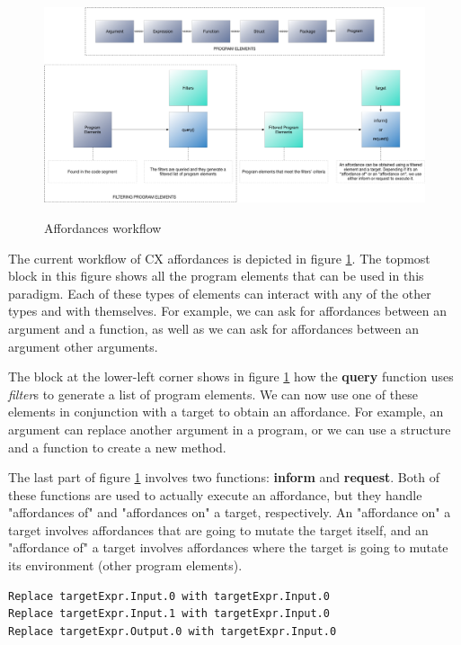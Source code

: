 \documentclass[11pt,fleqn,openany]{book} %
\begin{document}
\begin{figure}
\caption{Affordances workflow}
\centering
\includegraphics[width=1.0\textwidth]{img/affordances.png}
\label{figure:affordances-workflow}
\end{figure}

The current workflow of CX affordances is depicted in figure \ref{figure:affordances-workflow}. The topmost block in this figure shows all the program elements that can be used in this paradigm. Each of these types of elements can interact with any of the other types and with themselves. For example, we can ask for affordances between an argument and a function, as well as we can ask for affordances between an argument other arguments.

The block at the lower-left corner shows in figure \ref{figure:affordances-workflow} how the \textbf{query} function uses \emph{filter}s to generate a list of program elements. We can now use one of these elements in conjunction with a target to obtain an affordance. For example, an argument can replace another argument in a program, or we can use a structure and a function to create a new method.

The last part of figure \ref{figure:affordances-workflow} involves two functions: \textbf{inform} and \textbf{request}. Both of these functions are used to actually execute an affordance, but they handle "affordances of" and "affordances on" a target, respectively. An "affordance on" a target involves affordances that are going to mutate the target itself, and an "affordance of" a target involves affordances where the target is going to mutate its environment (other program elements).

\begin{lstlisting}[caption={A list of "affordances of" an argument},captionpos=b,label={listing:affordances-of}]
Replace targetExpr.Input.0 with targetExpr.Input.0
Replace targetExpr.Input.1 with targetExpr.Input.0
Replace targetExpr.Output.0 with targetExpr.Input.0
\end{lstlisting}
\end{document}
